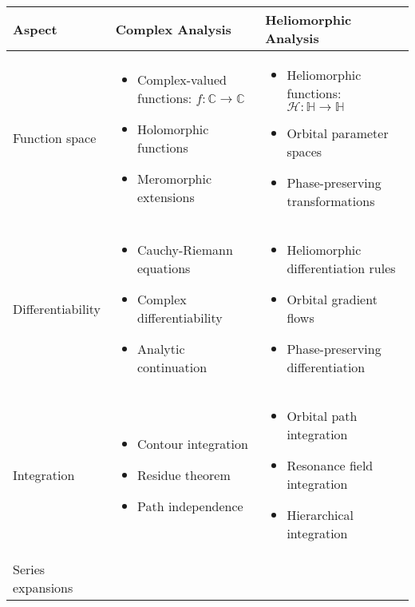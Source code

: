 \begin{table}[h]
\centering
\begin{tabular}{|p{3cm}|p{5cm}|p{5cm}|}
\hline
\textbf{Aspect} & \textbf{Complex Analysis} & \textbf{Heliomorphic Analysis} \\
\hline
Function space & 
\begin{itemize}
    \item Complex-valued functions: $f: \mathbb{C} \to \mathbb{C}$
    \item Holomorphic functions
    \item Meromorphic extensions
\end{itemize} &
\begin{itemize}
    \item Heliomorphic functions: $\mathcal{H}: \mathbb{H} \to \mathbb{H}$
    \item Orbital parameter spaces
    \item Phase-preserving transformations
\end{itemize} \\
\hline
Differentiability & 
\begin{itemize}
    \item Cauchy-Riemann equations
    \item Complex differentiability
    \item Analytic continuation
\end{itemize} &
\begin{itemize}
    \item Heliomorphic differentiation rules
    \item Orbital gradient flows
    \item Phase-preserving differentiation
\end{itemize} \\
\hline
Integration & 
\begin{itemize}
    \item Contour integration
    \item Residue theorem
    \item Path independence
\end{itemize} &
\begin{itemize}
    \item Orbital path integration
    \item Resonance field integration
    \item Hierarchical integration
\end{itemize} \\
\hline
Series expansions & 
\begin{itemize}

\end{itemize}
\end{tabular}
\end{table}
